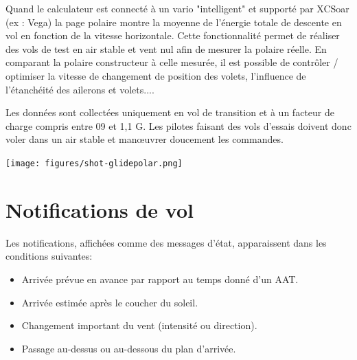Quand le calculateur est connecté à un vario "intelligent" et supporté par XCSoar (ex : Vega) la page polaire montre la moyenne de l'énergie totale de descente en vol en fonction de la vitesse horizontale. Cette fonctionnalité permet de réaliser des vols de test en air stable et vent nul afin de mesurer la polaire réelle. En comparant la polaire constructeur à celle mesurée, il est possible de contrôler / optimiser la vitesse de changement de position des volets, l'influence de l'étanchéité des ailerons et volets....

Les données sont collectées uniquement en vol de transition et à un facteur de charge compris entre 09 et 1,1 G. Les pilotes faisant des vols d'essais doivent donc voler dans un air stable et manœuvrer doucement les commandes.
\begin{center}
\texttt{[image: figures/shot-glidepolar.png]}
\end{center}

\section{Notifications de vol}

Les notifications, affichées comme des messages d'état, apparaissent dans les conditions suivantes:
\begin{itemize}
\item Arrivée prévue en avance par rapport au temps donné d'un AAT.
\item Arrivée estimée après le coucher du soleil.
\item Changement important du vent (intensité ou direction).
\item Passage au-dessus ou au-dessous du plan d'arrivée.
\end{itemize}
